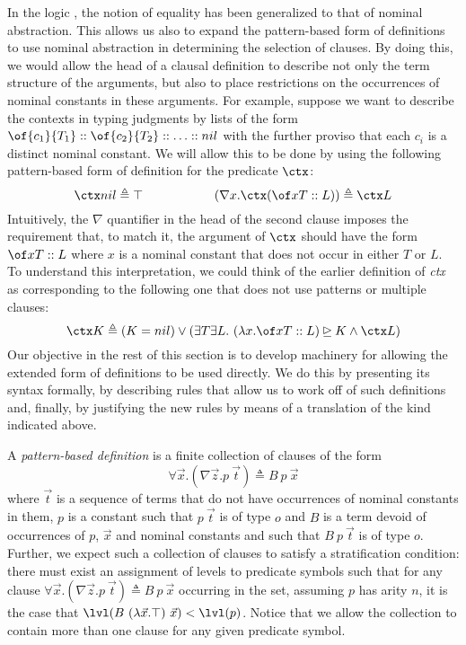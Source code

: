 In the logic \logic, the notion of equality has been generalized to
that of nominal abstraction. This allows us also to expand the
pattern-based form of definitions to use nominal abstraction in
determining the selection of clauses. By doing this, we would allow
the head of a clausal definition to describe not only the term
structure of the arguments, but also to place restrictions on the
occurrences of nominal constants in these arguments.
For example, suppose we want to describe the contexts in typing
judgments by lists of the form $\of {c_1} {T_1} :: \of {c_2} {T_2} ::
\ldots :: nil$ with the further proviso that each $c_i$ is a distinct
nominal constant. We will allow this to be done by using the following
pattern-based form of definition for the predicate $\ctx$:
\begin{equation*}
\ctx nil \triangleq \top \hspace{2cm}
(\nabla x. \ctx (\of x T :: L)) \triangleq \ctx L
\end{equation*}
Intuitively, the $\nabla$ quantifier in the head of the second clause
imposes the requirement that, to match it, the argument of $\ctx$
should have the form $\of x T :: L$ where $x$ is a nominal constant
that does not occur in either $T$ or $L$. To understand this
interpretation, we could think of the earlier definition of {\sl ctx}
as corresponding to the following one that does not use patterns or
multiple clauses:
\begin{equation*}
\ctx K \triangleq (K = nil) \lor
(\exists T \exists L.~ (\lambda x . \of x T :: L) \unrhd K \land \ctx
L)
\end{equation*}
Our objective in the rest of this section is to develop machinery
for allowing the extended form of definitions to be used directly. We
do this by presenting its
syntax formally, by describing rules that allow us to work off of such
definitions and, finally, by justifying the new rules by means of a
translation of the kind indicated above.

\begin{definition}
A {\em pattern-based definition} is a finite collection of clauses of
the form
\[\forall \vec{x}.(\nabla \vec{z}. p\ \vec{t}) \triangleq
B\ p\ \vec{x}\] where $\vec{t}$ is a sequence of terms that do not
have occurrences of nominal constants in them, $p$ is a constant such
that $p\ \vec{t}$ is of type $o$ and $B$ is a term devoid of
occurrences of $p$, $\vec{x}$ and nominal constants and such that $B\
p\ \vec{t}$ is of type $o$. Further, we expect such a collection of
clauses to satisfy a stratification condition: there must exist an
assignment of levels to predicate symbols such that for any clause
$\forall \vec{x}.(\nabla \vec{z}. p\ \vec{t}) \triangleq B\ p\
\vec{x}$ occurring in the set, assuming $p$ has arity $n$, it is the
case that $\lvl(B\ (\lambda \vec{x}.\top)\ \vec{x}) <
\lvl(p)$. Notice that we allow the collection to contain more than one
clause for any given predicate symbol.
\end{definition}

